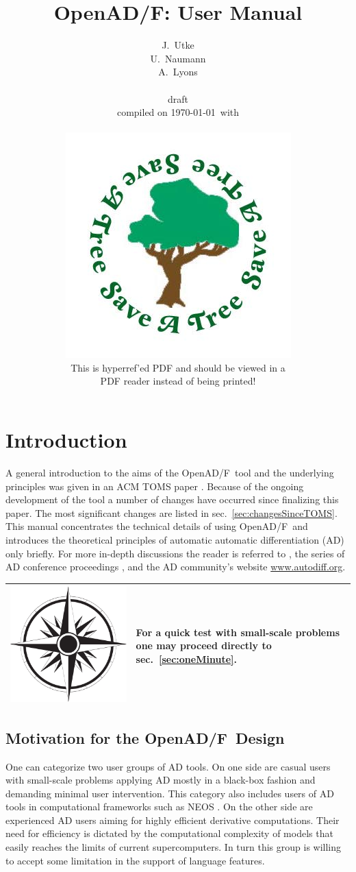 \documentclass{book}
\title{OpenAD/F: User Manual}
\author{J.~Utke  \\
	U.~Naumann \\
	A.~Lyons \\\\
\scriptsize draft  \\
\scriptsize compiled on \today\ with \\
\framebox{
\begin{minipage}{6.5cm}
\tiny

\end{minipage}
}
\vspace{4cm}
\\
\includegraphics[width=.2\textwidth]{savetree.jpg}\\[1ex]
\Large This is hyperref'ed PDF and should be viewed in a \\[.5ex]
\Large PDF reader instead of being printed!
}
\date{ }
\newcommand{\OpenADF}{OpenAD/F}
\newcommand{\refsec}[1]{{sec.~\ref{#1}}}
\newcommand{\nav}[1]{
\begin{tabular}{|m{.03\textwidth}|m{.92\textwidth}|}\hline
\vspace{1mm}
\includegraphics[width=.03\textwidth]{windrose_zh1}&
\vspace{1mm}
\begin{minipage}[c]{.86\textwidth}
\small {#1}
\end{minipage}
\vspace{1mm}
\\\hline
\end{tabular}
}
\begin{document}
\maketitle
\tableofcontents
\listoffigures
\listoftables

\pagestyle{fancy}
\lstset{basicstyle=\small\tt, 
	numbers=left, 
	numberstyle=\scriptsize,
  	stepnumber=1, 
	numbersep=10pt, 
	breaklines=true,
	resetmargins=false,
	xleftmargin=6ex,
	columns=fullflexible}
\chapter{Introduction} \label{sec:Introduction}

A general introduction to the aims of the \OpenADF\ tool and the underlying principles 
was given in an ACM TOMS paper \cite{Utke2008OAM}. 
Because of the ongoing development of the tool a number of changes have occurred 
since finalizing this paper. The most significant changes are listed in \refsec{sec:changesSinceTOMS}.
This manual concentrates the technical details of using \OpenADF\ and introduces the 
theoretical principles of automatic automatic differentiation (AD) only 
briefly. For more in-depth discussions the reader is referred to 
\cite{Griewank2008EDP}, the series of AD conference proceedings 
\cite{Griewank1991ADo,Berz1996CDT,Corliss2002ADo,Bucker2005ADA,Bischof2008AiA},
and the AD community's website \url{www.autodiff.org}. \\
\nav{For a quick test with small-scale problems one may proceed directly to \refsec{sec:oneMinute}.} 

\section{Motivation for the \OpenADF\ Design}


One can categorize two user groups of AD tools. 
On one side are casual users 
with small-scale problems applying AD mostly in a black-box fashion 
and demanding minimal user intervention. 
This category also includes users of AD tools in  computational 
frameworks such as NEOS \cite{neosWeb}.
On the other side are experienced AD users aiming for highly efficient 
derivative computations.
Their need for efficiency is dictated by the 
computational complexity of models that easily reaches the limits of  current 
supercomputers. 
In turn this group is willing to accept some limitation in the support of 
language features.
\end{document}
